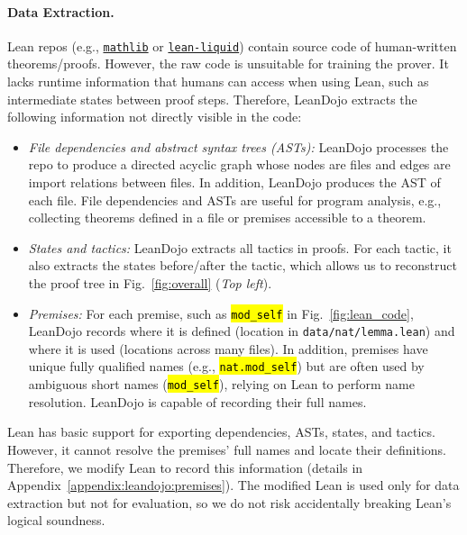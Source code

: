\documentclass{article}
\DeclareRobustCommand{\hlorange}[1]{{\sethlcolor{myorange}\hl{#1}}}
\newcommand{\smallsec}[1]{\vspace{-1mm} \paragraph{#1.}}
\begin{document}
\smallsec{Data Extraction}
Lean repos (e.g., \href{https://github.com/leanprover-community/mathlib}{\texttt{mathlib}} or \href{https://github.com/leanprover-community/lean-liquid}{\texttt{lean-liquid}}) contain source code of human-written theorems/proofs. However, the raw code is unsuitable for training the prover. It lacks runtime information that humans can access when using Lean, such as intermediate states between proof steps. Therefore, LeanDojo extracts the following information not directly visible in the code:
\begin{itemize}[leftmargin=*]

\item \emph{File dependencies and abstract syntax trees (ASTs):} LeanDojo processes the repo to produce a directed acyclic graph whose nodes are files and edges are import relations between files. In addition, LeanDojo produces the AST of each file. File dependencies and ASTs are useful for program analysis, e.g., collecting theorems defined in a file or premises accessible to a theorem.

\item \emph{States and tactics:} LeanDojo extracts all tactics in proofs. For each tactic, it also extracts the states before/after the tactic, which allows us to reconstruct the proof tree in Fig.~\ref{fig:overall} (\emph{Top left}).

\item \emph{Premises:} For each premise, such as \hlorange{\texttt{mod\_self}} in Fig.~\ref{fig:lean_code}, LeanDojo records where it is defined (location in \texttt{data/nat/lemma.lean}) and where it is used (locations across many files). In addition, premises have unique fully qualified names (e.g., \hlorange{\texttt{nat.mod\_self}}) but are often used by ambiguous short names (\hlorange{\texttt{mod\_self}}), relying on Lean to perform name resolution. LeanDojo is capable of recording their full names.
\end{itemize}

Lean has basic support for exporting dependencies, ASTs, states, and tactics. However, it cannot resolve the premises' full names and locate their definitions. Therefore, we modify Lean to record this information (details in Appendix~\ref{appendix:leandojo:premises}). The modified Lean is used only for data extraction but not for evaluation, so we do not risk accidentally breaking Lean's logical soundness. 
\end{document}
